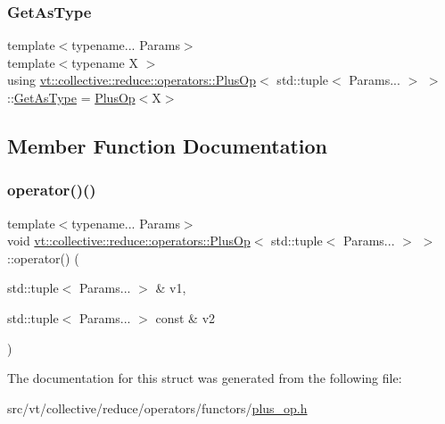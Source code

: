 \subsubsection{\texorpdfstring{Get\+As\+Type}{GetAsType}}
{\footnotesize\ttfamily template$<$typename... Params$>$ \\
template$<$typename X $>$ \\
using \hyperlink{structvt_1_1collective_1_1reduce_1_1operators_1_1_plus_op}{vt\+::collective\+::reduce\+::operators\+::\+Plus\+Op}$<$ std\+::tuple$<$ Params... $>$ $>$\+::\hyperlink{structvt_1_1collective_1_1reduce_1_1operators_1_1_plus_op_3_01std_1_1tuple_3_01_params_8_8_8_01_4_01_4_af17246b42e889a6ac6a257873ba8e5cc}{Get\+As\+Type} =  \hyperlink{structvt_1_1collective_1_1reduce_1_1operators_1_1_plus_op}{Plus\+Op}$<$X$>$}



\subsection{Member Function Documentation}
\mbox{\label{structvt_1_1collective_1_1reduce_1_1operators_1_1_plus_op_3_01std_1_1tuple_3_01_params_8_8_8_01_4_01_4_a55145dc3f6b44e23f89abed5706506f9}} 
\subsubsection{\texorpdfstring{operator()()}{operator()()}}
{\footnotesize\ttfamily template$<$typename... Params$>$ \\
void \hyperlink{structvt_1_1collective_1_1reduce_1_1operators_1_1_plus_op}{vt\+::collective\+::reduce\+::operators\+::\+Plus\+Op}$<$ std\+::tuple$<$ Params... $>$ $>$\+::operator() (\begin{DoxyParamCaption}\item[{std\+::tuple$<$ Params... $>$ \&}]{v1,  }\item[{std\+::tuple$<$ Params... $>$ const \&}]{v2 }\end{DoxyParamCaption})\hspace{0.3cm}{\ttfamily [inline]}}



The documentation for this struct was generated from the following file\+:\begin{DoxyCompactItemize}
\item 
src/vt/collective/reduce/operators/functors/\hyperlink{plus__op_8h}{plus\+\_\+op.\+h}\end{DoxyCompactItemize}
